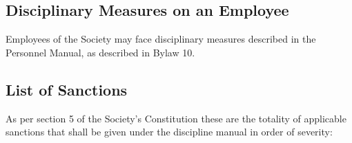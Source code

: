 \subsection {Disciplinary Measures on an Employee} 

\begin{longenum}[ label*=\thesubsection.\arabic*., align=left]  
		\item Employees of the Society may face disciplinary measures described in the Personnel Manual, as described in Bylaw 10.
\end{longenum}
\subsection {List of Sanctions} 
As per section 5 of the Society's Constitution these are the totality of applicable sanctions that shall be given under the discipline manual in order of severity:

